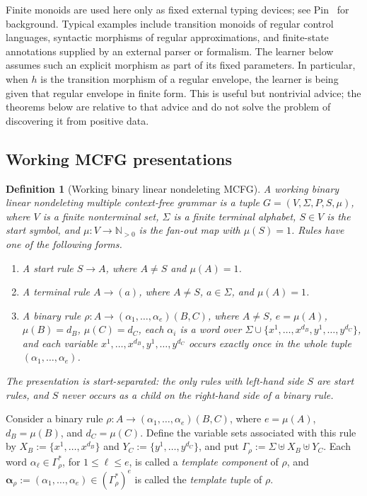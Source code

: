 \documentclass[11pt,a4paper]{article}
\newtheorem{definition}[theorem]{Definition}
\theoremstyle{remark}
\begin{document}
Finite monoids are used here only as fixed external typing devices; see
Pin~\cite{Pin1986} for background.  Typical examples include transition
monoids of regular control languages, syntactic morphisms of regular
approximations, and finite-state annotations supplied by an external parser or
formalism.  The learner below assumes such an explicit morphism as part of its
fixed parameters.  In particular, when \(h\) is the transition morphism of a
regular envelope, the learner is being given that regular envelope in finite
form.  This is useful but nontrivial advice; the theorems below are relative to
that advice and do not solve the problem of discovering it from positive data.

\subsection{Working MCFG presentations}

\begin{definition}[Working binary linear nondeleting MCFG]
\label{def:working-mcfg}
A \emph{working binary linear nondeleting multiple context-free grammar} is a
tuple \(G=(V,\Sigma,P,S,\mu)\), where \(V\) is a finite nonterminal set,
\(\Sigma\) is a finite terminal alphabet, \(S\in V\) is the start symbol, and
\(\mu\colon V\to\mathbb N_{>0}\) is the fan-out map with \(\mu(S)=1\).  Rules
have one of the following forms.
\begin{enumerate}[label=(\roman*),leftmargin=*]
\item A start rule \(S\to A\), where \(A\ne S\) and \(\mu(A)=1\).
\item A terminal rule \(A\to(a)\), where \(A\ne S\), \(a\in\Sigma\), and
\(\mu(A)=1\).
\item A binary rule \(\rho\colon A\to(\alpha_1,\ldots,\alpha_e)(B,C)\), where
\(A\ne S\), \(e=\mu(A)\), \(\mu(B)=d_B\), \(\mu(C)=d_C\), each \(\alpha_i\) is
a word over \(\Sigma\cup\{x^1,\ldots,x^{d_B},y^1,\ldots,y^{d_C}\}\), and each
variable \(x^1,\ldots,x^{d_B},y^1,\ldots,y^{d_C}\) occurs exactly once in the
whole tuple \((\alpha_1,\ldots,\alpha_e)\).
\end{enumerate}
The presentation is \emph{start-separated}: the only rules with left-hand side
\(S\) are start rules, and \(S\) never occurs as a child on the right-hand side
of a binary rule.
\end{definition}

Consider a binary rule
\(\rho\colon A\to(\alpha_1,\ldots,\alpha_e)(B,C)\), where
\(e=\mu(A)\), \(d_B=\mu(B)\), and \(d_C=\mu(C)\).
Define the variable sets associated with this rule by
\(X_B:=\{x^1,\ldots,x^{d_B}\}\) and
\(Y_C:=\{y^1,\ldots,y^{d_C}\}\), and put
\(\Gamma_\rho:=\Sigma\uplus X_B\uplus Y_C\).
Each word \(\alpha_\ell\in\Gamma_\rho^*\), for
\(1\le \ell\le e\), is called a \emph{template component} of \(\rho\), and
\(\boldsymbol{\alpha}_\rho:=(\alpha_1,\ldots,\alpha_e)
\in(\Gamma_\rho^*)^e\) is called the \emph{template tuple} of \(\rho\).
\end{document}
